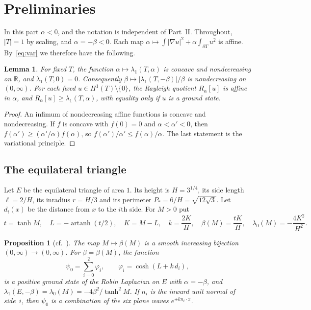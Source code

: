\documentclass[11pt]{article}
\newtheorem{proposition}[theorem]{Proposition}
\newtheorem{lemma}[theorem]{Lemma}
\theoremstyle{remark}
\newcommand{\R}{\mathbb{R}}
\newcommand{\E}{E}
\DeclareMathOperator{\artanh}{artanh}
\begin{document}
\section{Preliminaries}\label{sec:prelim}

In this part $\alpha<0$, and the notation is independent of Part~II. Throughout, $|T|=1$ by scaling,
and $\alpha=-\beta<0$. Each map
$\alpha\mapsto\int|\nabla u|^2+\alpha\int_{\partial T}u^2$ is affine. By~\eqref{eq:var} we therefore have
the following.

\begin{lemma}\label{lem:concave}
For fixed $T$, the function $\alpha\mapsto\lambda_1(T,\alpha)$ is concave and nondecreasing on $\R$, and
$\lambda_1(T,0)=0$. Consequently $\beta\mapsto|\lambda_1(T,-\beta)|/\beta$ is nondecreasing on
$(0,\infty)$. For each fixed $u\in H^1(T)\setminus\{0\}$, the Rayleigh quotient $R_\alpha[u]$ is affine
in $\alpha$, and $R_\alpha[u]\ge\lambda_1(T,\alpha)$, with equality only if $u$ is a ground state.
\end{lemma}

\begin{proof}
An infimum of nondecreasing affine functions is concave and nondecreasing. If $f$ is concave with
$f(0)=0$ and $\alpha<\alpha'<0$, then $f(\alpha')\ge(\alpha'/\alpha)f(\alpha)$, so
$f(\alpha')/\alpha'\le f(\alpha)/\alpha$. The last statement is the variational principle.
\end{proof}

\subsection{The equilateral triangle}

Let $\E$ be the equilateral triangle of area $1$. Its height is $H=3^{1/4}$, its side length
$\ell=2/H$, its inradius $r=H/3$ and its perimeter $P_*=6/H=\sqrt{12\sqrt3}$. Let $d_i(x)$ be the
distance from $x$ to the $i$th side. For $M>0$ put
\begin{equation}\label{eq:param}
  t=\tanh M,\quad L=-\artanh(t/2),\quad K=M-L,\quad k=\frac{2K}{H},\quad
  \beta(M)=\frac{tK}{H},\quad \lambda_0(M)=-\frac{4K^2}{H^2}.
\end{equation}

\begin{proposition}[{cf.~\cite{McCartin,KLV}}]\label{prop:equi}
The map $M\mapsto\beta(M)$ is a smooth increasing bijection $(0,\infty)\to(0,\infty)$. For
$\beta=\beta(M)$, the function
\[
  \psi_0=\sum_{i=0}^2\varphi_i,\qquad \varphi_i=\cosh(L+k\,d_i),
\]
is a positive ground state of the Robin Laplacian on $\E$ with $\alpha=-\beta$, and
$\lambda_1(\E,-\beta)=\lambda_0(M)=-4\beta^2/\tanh^2M$. If $n_i$ is the inward unit normal of side~$i$,
then $\psi_0$ is a combination of the six plane waves $e^{\pm k n_i\cdot x}$.
\end{proposition}
\end{document}

